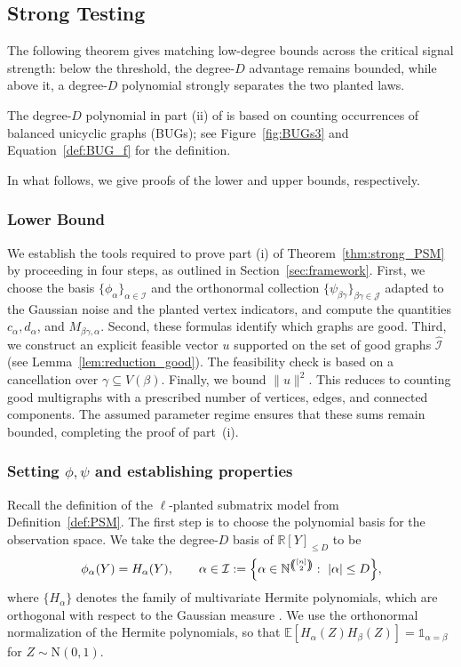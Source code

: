 \documentclass[11pt, letterpaper]{article}
\numberwithin{equation}{section}
\newcommand{\cJ}{\mathcal{J}}
\newcommand{\cI}{\mathcal{I}}
\newcommand{\E}{\mathbb{E}}
\newcommand{\goodI}{\widehat{\mathcal{I}}}
\begin{document}
\subsection{Strong Testing}\label{sec:psm-strong-testing}
The following theorem gives matching low-degree bounds across the critical signal strength: below the threshold, the degree-$D$ advantage remains bounded, while above it, a degree-$D$ polynomial strongly separates the two planted laws.
\thmPSMstrong*

The degree-$D$ polynomial in part (ii) of  is based on counting occurrences of balanced unicyclic graphs (BUGs); see Figure~\ref{fig:BUGs3} and Equation~\eqref{def:BUG_f} for the definition. 

\noindent In what follows, we give proofs of the lower and upper bounds, respectively.

\subsubsection{Lower Bound}\label{sec:psm-lower-bound-strong}


We establish the tools required to prove part (i) of Theorem~\ref{thm:strong_PSM} by proceeding in four steps, as outlined in Section~\ref{sec:framework}. First, we choose the basis $\{\phi_\alpha\}_{\alpha \in \cI}$ and the orthonormal collection $\{\psi_{\beta\gamma}\}_{\beta\gamma \in \cJ}$ adapted to the Gaussian noise and the planted vertex indicators, and compute the quantities $c_\alpha,d_\alpha$, and $M_{\beta\gamma,\alpha}$. Second, these formulas identify which graphs are good. Third, we construct an explicit feasible vector $u$ supported on the set of good graphs $\goodI$ (see Lemma~\ref{lem:reduction_good}). The feasibility check is based on a cancellation over $\gamma\subseteq V(\beta)$. Finally, we bound $\|u\|^2$. This reduces to counting good multigraphs with a prescribed number of vertices, edges, and connected components. The assumed parameter regime ensures that these sums remain bounded, completing the proof of part~(i).


\subsubsection*{Setting $\phi,\psi$ and establishing properties}
Recall the definition of the $\ell$-planted submatrix model from Definition~\ref{def:PSM}. The first step is to choose the polynomial basis for the observation space. We take the degree-$D$ basis of $\mathbb R[Y]_{\le D}$ to be
\begin{equation}\label{eq:phi_def_mat}
\phi_\alpha(Y)=H_\alpha(Y), \qquad \alpha \in \mathcal I:=\Bigl\{\alpha \in \mathbb N^{\left(\!\!\binom{[n]}{2}\!\!\right)}:\ |\alpha|\le D\Bigr\},
\end{equation}
where $\{H_\alpha\}$ denotes the family of multivariate Hermite polynomials, which are orthogonal with respect to the Gaussian measure \cite{szeg1939orthogonal}. We use the orthonormal normalization of the Hermite polynomials, so that $\E[H_\alpha(Z)H_\beta(Z)]=\mathds{1}_{\alpha=\beta}$ for $Z\sim \mathrm N(0,1)$.
\end{document}
